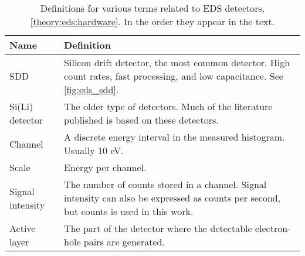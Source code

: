\begin{table}[pht]
    \begin{center}
        \caption{
            Definitions for various terms related to EDS detectors, \cref{theory:eds:hardware}.
            In the order they appear in the text.
        }
        \renewcommand*{\arraystretch}{1.4}
        \label{tab:eds:hardware}
        \begin{tabular}{p{2.9cm}p{12cm}}
            \hline
            \textbf{Name}                      & \textbf{Definition}                                                                                                                                                                                                                                 \\
            \hline
            SDD                                & Silicon drift detector, the most common detector.  High count rates, fast processing, and low capacitance.  See \cref{fig:eds_sdd}.                                                                                                                 \\
            Si(Li) detector                    & The older type of detectors. Much of the literature published is based on these detectors.                                                                                                                                                          \\
            Channel                            & A discrete energy interval in the measured histogram. Usually 10 eV.                                                                                                                                                                                \\
            Scale                              & Energy per channel.                                                                                                                                                                                                                                 \\
            Signal intensity                   & The number of counts stored in a channel. Signal intensity can also be expressed as counts per second, but counts is used in this work.                                                                                                             \\
            Active layer                       & The part of the detector where the detectable electron-hole pairs are generated.                                                                                                                                                                    \\

\end{tabular}
\end{center}
\end{table}
